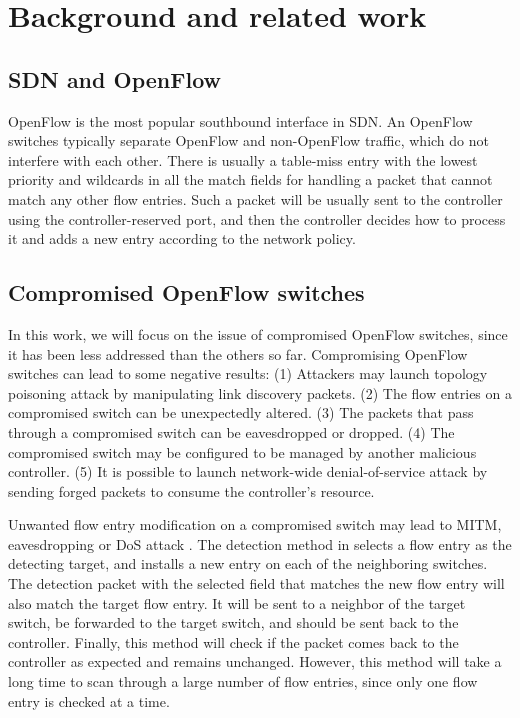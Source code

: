 \documentclass[conference]{IEEEtran}
\begin{document}
\section{Background and related work}
\label{sec:background}
\subsection{SDN and OpenFlow}
\label{SDN and OpenFlow}
OpenFlow is the most popular southbound interface in SDN. An OpenFlow switches typically separate OpenFlow and non-OpenFlow traffic, which do not interfere with each other. There is usually a table-miss entry with the lowest priority and wildcards in all the match fields for handling a packet that cannot match any other flow entries. Such a packet will be usually sent to the controller using the controller-reserved port, and then the controller decides how to process it and adds a new entry according to the network policy. 

\subsection{Compromised OpenFlow switches}
In this work, we will focus on the issue of compromised OpenFlow switches, since it has been less addressed than the others so far. Compromising OpenFlow switches can lead to some negative results: (1) Attackers may launch topology poisoning attack by manipulating link discovery packets. (2) The flow entries on a compromised switch can be unexpectedly altered. (3) The packets that pass through a compromised switch can be eavesdropped or dropped. (4) The compromised switch may be configured to be managed by another malicious controller. (5) It is possible to launch network-wide denial-of-service attack by sending forged packets to consume the controller's resource. 

Unwanted flow entry modification on a compromised switch may lead to MITM, eavesdropping or DoS attack \cite{AAS14}. The detection method in \cite{CKGL15} selects a flow entry as the detecting target, and installs a new entry on each of the neighboring switches. The detection packet with the selected field that matches the new flow entry will also match the target flow entry. It will be sent to a neighbor of the target switch, be forwarded to the target switch, and should be sent back to the controller. Finally, this method will check if the packet comes back to the controller as expected and remains unchanged. However, this method will take a long time to scan through a large number of flow entries, since only one flow entry is checked at a time.
\end{document}
